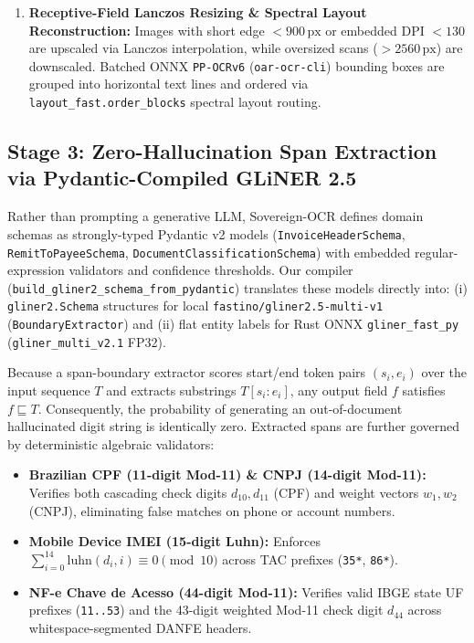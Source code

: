 \documentclass[10pt,twocolumn,letterpaper]{article}
\begin{document}
\begin{enumerate}[leftmargin=1.4em,itemsep=1.5pt,topsep=2pt]
\begin{equation}
    \mathcal{J}(\theta) = \text{Var}(r_\theta) + \frac{1}{2}\mathbb{E}\!\left[(\Delta r_\theta)^2\right], \quad r_\theta(y) = \sum_x M_\theta(x,y)
    \end{equation}
    applying bicubic deskew when $|\theta^*| \ge 0.4^\circ$ and $\mathcal{J}(\theta^*) > 1.03\,\mathcal{J}(0^\circ)$.
    \item \textbf{Receptive-Field Lanczos Resizing \& Spectral Layout Reconstruction:} Images with short edge $<900\,\text{px}$ or embedded DPI $<130$ are upscaled via Lanczos interpolation, while oversized scans ($>2560\,\text{px}$) are downscaled. Batched ONNX \texttt{PP-OCRv6} (\texttt{oar-ocr-cli}) bounding boxes are grouped into horizontal text lines and ordered via \texttt{layout\_fast.order\_blocks} spectral layout routing.
\end{enumerate}

\subsection{Stage 3: Zero-Hallucination Span Extraction via Pydantic-Compiled GLiNER 2.5}

Rather than prompting a generative LLM, Sovereign-OCR defines domain schemas as strongly-typed Pydantic v2 models (\texttt{InvoiceHeaderSchema}, \texttt{RemitToPayeeSchema}, \texttt{DocumentClassificationSchema}) with embedded regular-expression validators and confidence thresholds. Our compiler (\texttt{build\_gliner2\_schema\_from\_pydantic}) translates these models directly into: (i) \texttt{gliner2.Schema} structures for local \texttt{fastino/gliner2.5-multi-v1} (\texttt{BoundaryExtractor}) and (ii) flat entity labels for Rust ONNX \texttt{gliner\_fast\_py} (\texttt{gliner\_multi\_v2.1} FP32).

Because a span-boundary extractor scores start/end token pairs $(s_i, e_i)$ over the input sequence $T$ and extracts substrings $T[s_i : e_i]$, any output field $f$ satisfies $f \sqsubseteq T$. Consequently, the probability of generating an out-of-document hallucinated digit string is identically zero. Extracted spans are further governed by deterministic algebraic validators:
\begin{itemize}[leftmargin=1.3em,itemsep=1.5pt,topsep=2pt]
    \item \textbf{Brazilian CPF (11-digit Mod-11) \& CNPJ (14-digit Mod-11):} Verifies both cascading check digits $d_{10}, d_{11}$ (CPF) and weight vectors $w_1, w_2$ (CNPJ), eliminating false matches on phone or account numbers.
    \item \textbf{Mobile Device IMEI (15-digit Luhn):} Enforces $\sum_{i=0}^{14} \text{luhn}(d_i, i) \equiv 0 \pmod{10}$ across TAC prefixes (\texttt{35*}, \texttt{86*}).
    \item \textbf{NF-e Chave de Acesso (44-digit Mod-11):} Verifies valid IBGE state UF prefixes (\texttt{11..53}) and the 43-digit weighted Mod-11 check digit $d_{44}$ across whitespace-segmented DANFE headers.
\end{itemize}
\end{document}
